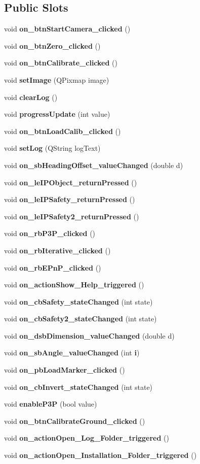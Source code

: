 \subsection*{Public Slots}
\begin{DoxyCompactItemize}
\item 
void \textbf{ on\+\_\+btn\+Start\+Camera\+\_\+clicked} ()
\item 
void \textbf{ on\+\_\+btn\+Zero\+\_\+clicked} ()
\item 
void \textbf{ on\+\_\+btn\+Calibrate\+\_\+clicked} ()
\item 
void \textbf{ set\+Image} (Q\+Pixmap image)
\item 
void \textbf{ clear\+Log} ()
\item 
void \textbf{ progress\+Update} (int value)
\item 
void \textbf{ on\+\_\+btn\+Load\+Calib\+\_\+clicked} ()
\item 
void \textbf{ set\+Log} (Q\+String log\+Text)
\item 
void \textbf{ on\+\_\+sb\+Heading\+Offset\+\_\+value\+Changed} (double d)
\item 
void \textbf{ on\+\_\+le\+I\+P\+Object\+\_\+return\+Pressed} ()
\item 
void \textbf{ on\+\_\+le\+I\+P\+Safety\+\_\+return\+Pressed} ()
\item 
void \textbf{ on\+\_\+le\+I\+P\+Safety2\+\_\+return\+Pressed} ()
\item 
void \textbf{ on\+\_\+rb\+P3\+P\+\_\+clicked} ()
\item 
void \textbf{ on\+\_\+rb\+Iterative\+\_\+clicked} ()
\item 
void \textbf{ on\+\_\+rb\+E\+Pn\+P\+\_\+clicked} ()
\item 
void \textbf{ on\+\_\+action\+Show\+\_\+\+Help\+\_\+triggered} ()
\item 
void \textbf{ on\+\_\+cb\+Safety\+\_\+state\+Changed} (int state)
\item 
void \textbf{ on\+\_\+cb\+Safety2\+\_\+state\+Changed} (int state)
\item 
void \textbf{ on\+\_\+dsb\+Dimension\+\_\+value\+Changed} (double d)
\item 
void \textbf{ on\+\_\+sb\+Angle\+\_\+value\+Changed} (int \textbf{ i})
\item 
void \textbf{ on\+\_\+pb\+Load\+Marker\+\_\+clicked} ()
\item 
void \textbf{ on\+\_\+cb\+Invert\+\_\+state\+Changed} (int state)
\item 
void \textbf{ enable\+P3P} (bool value)
\item 
void \textbf{ on\+\_\+btn\+Calibrate\+Ground\+\_\+clicked} ()
\item 
void \textbf{ on\+\_\+action\+Open\+\_\+\+Log\+\_\+\+Folder\+\_\+triggered} ()
\item 
void \textbf{ on\+\_\+action\+Open\+\_\+\+Installation\+\_\+\+Folder\+\_\+triggered} ()
\end{DoxyCompactItemize}
